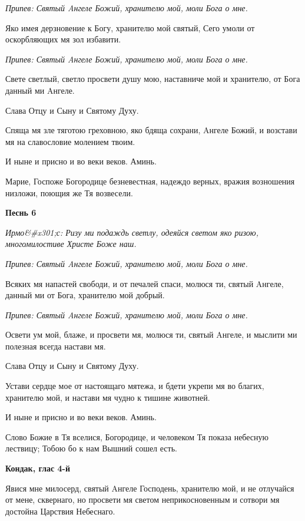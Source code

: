\itshape Припев:\normalfont{} Святый Aнгеле Божий, хранителю мой, моли Бога о мне.


Яко имея дерзновение к Богу, хранителю мой святый, Сего умоли от оскорбляющих мя зол избавити.


\itshape Припев:\normalfont{} Святый Aнгеле Божий, хранителю мой, моли Бога о мне.


Свете светлый, светло просвети душу мою, наставниче мой и хранителю, от Бога данный ми Aнгеле.


Слава Отцу и Сыну и Святому Духу.


Спяща мя зле тяготою греховною, яко бдяща сохрани, Aнгеле Божий, и возстави мя на славословие молением твоим.


И ныне и присно и во веки веков. Аминь.


Марие, Госпоже Богородице безневестная, надеждо верных, вражия возношения низложи, поющия же Тя возвесели.




\bfseries Песнь 6\normalfont{}


\itshape Ирмо&#x301;с:\normalfont{} Ризу ми подаждь светлу, одеяйся светом яко ризою, многомилостиве Христе Боже наш.


\itshape Припев:\normalfont{} Святый Aнгеле Божий, хранителю мой, моли Бога о мне.


Всяких мя напастей свободи, и от печалей спаси, молюся ти, святый Aнгеле, данный ми от Бога, хранителю мой добрый.


\itshape Припев:\normalfont{} Святый Aнгеле Божий, хранителю мой, моли Бога о мне.


Освети ум мой, блаже, и просвети мя, молюся ти, святый Aнгеле, и мыслити ми полезная всегда настави мя.


Слава Отцу и Сыну и Святому Духу.


Устави сердце мое от настоящаго мятежа, и бдети укрепи мя во благих, хранителю мой, и настави мя чудно к тишине животней.


И ныне и присно и во веки веков. Аминь.


Слово Божие в Тя вселися, Богородице, и человеком Тя показа небесную лествицу; Тобою бо к нам Вышний сошел есть.




\bfseries Кондак, глас 4-й\normalfont{}


Явися мне милосерд, святый Aнгеле Господень, хранителю мой, и не отлучайся от мене, сквернаго, но просвети мя светом неприкосновенным и сотвори мя достойна Царствия Небеснаго.




